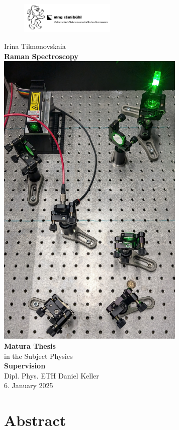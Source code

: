 \documentclass[a4paper]{article}
\date{November 2024}
\begin{document}
\begin{figure}
    \includegraphics[width=0.4\textwidth]{images/MNG_pic.png}
\end{figure}
\begin{center}
    \large
    Irina Tiknonovskaia\\
    \Huge \textbf{Raman Spectroscopy}
    \\[0.5cm]
    \includegraphics[width=9cm]{images/active_setup_photo.jpg}
    \\[0.5cm]
    \large
    \textbf{Matura Thesis}\\
    in the Subject Physics
    \\[0.25cm]
    \textbf{Supervision}\\
    Dipl. Phys. ETH Daniel Keller
    \\[0.25cm]
    6. January 2025
\end{center}
\newpage
{}
\section*{Abstract} 
\end{document}
